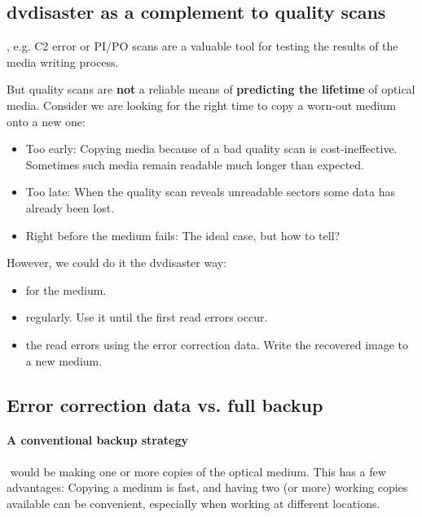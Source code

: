 \subsection{dvdisaster as a complement to quality scans}

, e.g. C2 error or PI/PO scans are a valuable tool
for testing the results of the media writing process.

\smallskip

But quality scans are {\bf not} a reliable means of
{\bf predicting the lifetime} of optical media.
Consider we are looking for the right time to copy a worn-out medium onto a new one:

\begin{itemize}
\item Too early: Copying media because of a bad quality scan is cost-ineffective.
  Sometimes such media remain readable much longer than expected.
\item Too late: When the quality scan reveals unreadable sectors some data has already been lost.
\item Right before the medium fails: The ideal case, but how to tell?
\end{itemize}

However, we could do it the dvdisaster way:

\begin{itemize}
\item {} for the medium.
\item {} regularly. Use it until the first read errors occur.
\item {} the read errors using the error correction data.
  Write the recovered image to a new medium.
\end{itemize}

\subsection{Error correction data vs. full backup}
\label{overview-backup}

\paragraph{A conventional backup strategy}$\!\!\!\!\!$ would be making one or 
more copies of the optical medium. This has a few advantages:
Copying a medium is fast, and having two (or more) working copies
available can be convenient, especially when working at different
locations.

